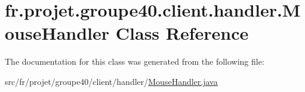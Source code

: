 \hypertarget{classfr_1_1projet_1_1groupe40_1_1client_1_1handler_1_1_mouse_handler}{}\section{fr.\+projet.\+groupe40.\+client.\+handler.\+Mouse\+Handler Class Reference}
\label{classfr_1_1projet_1_1groupe40_1_1client_1_1handler_1_1_mouse_handler}


The documentation for this class was generated from the following file\+:\begin{DoxyCompactItemize}
\item 
src/fr/projet/groupe40/client/handler/\hyperlink{_mouse_handler_8java}{Mouse\+Handler.\+java}\end{DoxyCompactItemize}
